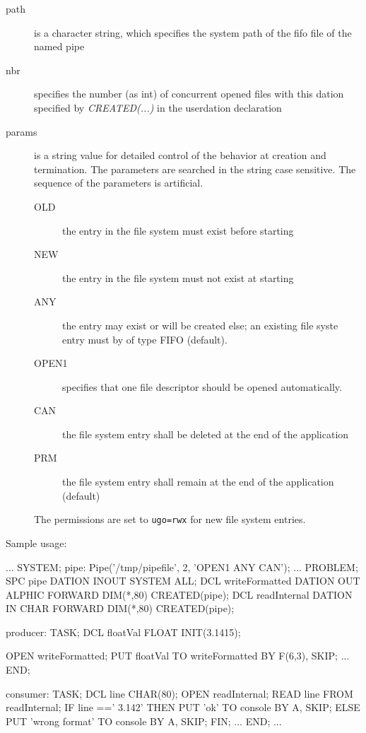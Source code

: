 \begin{description}
\item [path] is a character string,
     which specifies the system path of the fifo file
    of the named pipe
\item[nbr] specifies the number (as int) of concurrent opened files with this dation
     specified by {\em CREATED(...)} in the userdation declaration
\item [params] is a string value for detailed control of the behavior
     at creation and termination. The parameters are searched in the string
     case sensitive. The sequence of the parameters is artificial.
   \begin{description}
     \item[OLD] the entry in the file system must exist before starting
     \item[NEW] the entry in the file system must not exist at starting
     \item[ANY] the entry may exist or will be created else; an existing
                file syste entry must by of type FIFO (default).
     \item[OPEN1] specifies that one file descriptor should be opened 
                automatically.
     \item[CAN] the file system entry shall be deleted at the end of the 
                application
     \item[PRM] the file system entry shall remain at the end of the
                application (default)
   \end{description} 
   The permissions are set to \verb|ugo=rwx| for new file system entries.
\end{description}

Sample usage:
\begin{PEARLCode}
...
SYSTEM;
   pipe: Pipe('/tmp/pipefile', 2, 'OPEN1 ANY CAN');
...
PROBLEM;
   SPC pipe DATION INOUT SYSTEM ALL;
   DCL writeFormatted DATION OUT ALPHIC FORWARD DIM(*,80) CREATED(pipe);
   DCL readInternal   DATION IN  CHAR   FORWARD DIM(*,80) CREATED(pipe);

producer: TASK;
   DCL floatVal FLOAT INIT(3.1415);

   OPEN writeFormatted;
   PUT  floatVal TO writeFormatted BY F(6,3), SKIP;
...
END;

consumer: TASK;
   DCL line CHAR(80);
   OPEN readInternal;
   READ line FROM readInternal;
   IF line ==' 3.142' THEN
      PUT 'ok' TO console BY A, SKIP;
   ELSE
      PUT 'wrong format' TO console BY A, SKIP;
   FIN;
...
END;
...
\end{PEARLCode}

